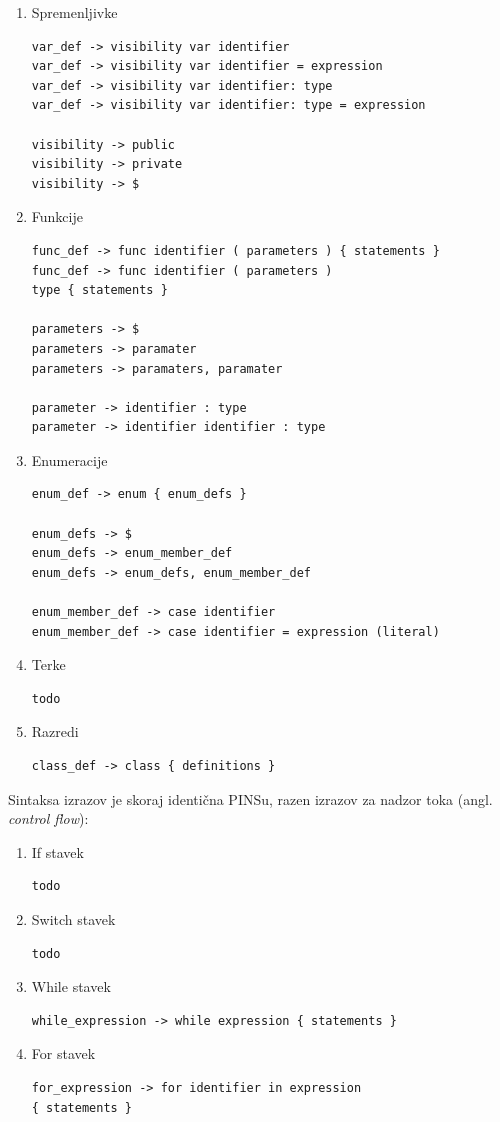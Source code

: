 \documentclass[a4paper, 12p]{book}
\begin{document}
\begin{enumerate}
	\item Spremenljivke
\begin{lstlisting}[]
var_def -> visibility var identifier 
var_def -> visibility var identifier = expression
var_def -> visibility var identifier: type 
var_def -> visibility var identifier: type = expression 

visibility -> public
visibility -> private
visibility -> $
\end{lstlisting}
	\item Funkcije
\begin{lstlisting}[]
func_def -> func identifier ( parameters ) { statements }
func_def -> func identifier ( parameters ) 
type { statements }

parameters -> $
parameters -> paramater
parameters -> paramaters, paramater

parameter -> identifier : type
parameter -> identifier identifier : type
\end{lstlisting}	
	\item Enumeracije
	
\begin{lstlisting}
enum_def -> enum { enum_defs }

enum_defs -> $
enum_defs -> enum_member_def
enum_defs -> enum_defs, enum_member_def

enum_member_def -> case identifier
enum_member_def -> case identifier = expression (literal)
\end{lstlisting}
	\item Terke
\begin{lstlisting}
todo
\end{lstlisting}
	\item Razredi
\begin{lstlisting}
class_def -> class { definitions }
\end{lstlisting}

\end{enumerate} 

Sintaksa izrazov je skoraj identična PINSu, razen izrazov za nadzor toka (angl. \textit{control flow}):

\begin{enumerate}
	\item If stavek
\begin{lstlisting}[]
todo
\end{lstlisting}
	\item Switch stavek
\begin{lstlisting}[]
todo
\end{lstlisting}
	\item While stavek
\begin{lstlisting}[]
while_expression -> while expression { statements }
\end{lstlisting}
	\item For stavek
\begin{lstlisting}[]
for_expression -> for identifier in expression 
{ statements }
\end{lstlisting}
\end{enumerate} 
\end{document}
